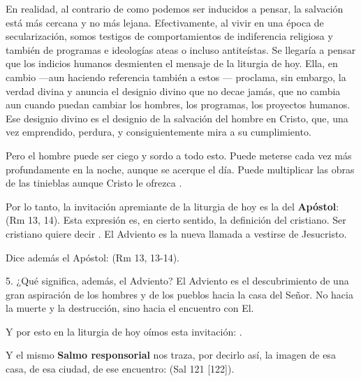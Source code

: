 \documentclass[]{article}
\begin{document}
En realidad, al contrario de como podemos ser inducidos a pensar, la salvación está más cercana y no más lejana. Efectivamente, al vivir en una época de secularización, somos testigos de comportamientos de indiferencia religiosa y también de programas e ideologías ateas o incluso antiteístas. Se llegaría a pensar que los indicios humanos desmienten el mensaje de la liturgia de hoy. Ella, en cambio ---aun haciendo referencia también a estos --- proclama, sin embargo, la verdad divina y anuncia el designio divino que no decae jamás, que no cambia aun cuando puedan cambiar los hombres, los programas, los proyectos humanos. Ese designio divino es el designio de la salvación del hombre en Cristo, que, una vez emprendido, perdura, y consiguientemente mira a su cumplimiento.

Pero el hombre puede ser ciego y sordo a todo esto. Puede meterse cada vez más profundamente en la noche, aunque se acerque el día. Puede multiplicar las obras de las tinieblas aunque Cristo le ofrezca .

Por lo tanto, la invitación apremiante de la liturgia de hoy es la del \textbf{Apóstol}:  (Rm 13, 14). Esta expresión es, en cierto sentido, la definición del cristiano. Ser cristiano quiere decir . El Adviento es la nueva llamada a vestirse de Jesucristo.

Dice además el Apóstol:  (Rm 13, 13-14).

5. ¿Qué significa, además, el Adviento? El Adviento es el descubrimiento de una gran aspiración de los hombres y de los pueblos hacia la casa del Señor. No hacia la muerte y la destrucción, sino hacia el encuentro con El.

Y por esto en la liturgia de hoy oímos esta invitación: .

Y el mismo \textbf{Salmo responsorial} nos traza, por decirlo así, la imagen de esa casa, de esa ciudad, de ese encuentro:  (Sal 121 {[}122{]}).
\end{document}
